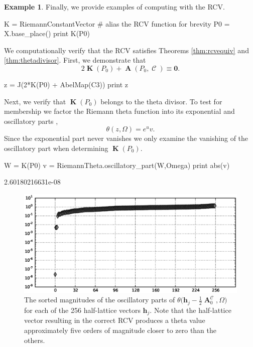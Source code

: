 \documentclass[12pt]{article}
\theoremstyle{definition}
\newtheorem{example}[theorem]{Example}
\DeclareMathOperator{\DivC}{\mathcal{C}}
\DeclareMathOperator{\RCV}{\boldsymbol{K}}
\DeclareMathOperator{\Abel}{\boldsymbol{A}}
\begin{document}
\begin{example}
Finally, we provide examples of computing with the RCV.
\begin{ipythoninput}
K = RiemannConstantVector   # alias the RCV function for brevity
P0 = X.base_place()
print K(P0)
\end{ipythoninput}
\begin{ipythonoutput}
[ 0.8488+0.7203j -0.5941-0.1146j -0.7432+0.8913j -0.8189+1.1381j]
\end{ipythonoutput}
We computationally verify that the RCV satisfies Theorems
\ref{thm:rcvequiv} and \ref{thm:thetadivisor}. First, we demonstrate
that
\begin{equation}
  2\RCV(P_0) + \Abel(P_0,\DivC) \equiv \boldsymbol{0}.
\end{equation}
\begin{ipythoninput}
z = J(2*K(P0) + AbelMap(C3))
print z
\end{ipythoninput}
\begin{ipythonoutput}
[ 0.+0.j  0.+0.j -0.-0.j -0.-0.j]
\end{ipythonoutput}
Next, we verify that $\RCV(P_0)$ belongs to the theta divisor. To test
for membership we factor the Riemann theta function into its exponential
and oscillatory parts \cite{NIST:DLMF,DHBvHS03},
\begin{equation}
  \theta(z,\Omega) = e^u v.
\end{equation}
Since the exponential part never vanishes we only examine the vanishing
of the oscillatory part when determining $\RCV(P_0)$.
\begin{ipythoninput}
W = K(P0)
v = RiemannTheta.oscillatory_part(W,Omega)
print abs(v)
\end{ipythoninput}
\begin{ipythonoutput}
2.60180216631e-08
\end{ipythonoutput}


\begin{figure}
  \centering
  \includegraphics[width=\textwidth]{oscvalues.eps}
  \caption{The sorted magnitudes of the oscillatory parts of
    $\theta\big( \boldsymbol{h}_j - \tfrac{1}{2}\Abel_0^{\DivC}, \Omega
    \big)$ for each of the 256 half-lattice vectors
    $\boldsymbol{h}_j$. Note that the half-lattice vector resulting in
    the correct RCV produces a theta value approximately five orders of
    magnitude closer to zero than the others.}
  \label{fig:oscvalues}
\end{figure}


\end{example}
\end{document}
